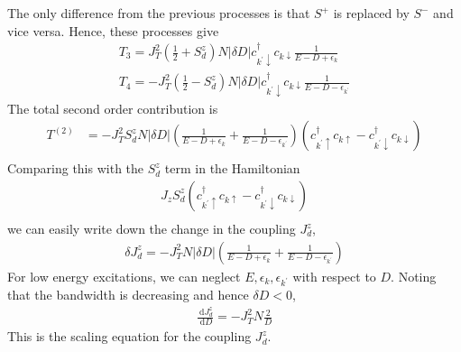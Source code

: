 \documentclass[twoside]{report}
\numberwithin{equation}{section}
\begin{document}
The only difference from the previous processes is that \(S^+\) is replaced by \(S^-\) and vice versa.
Hence, these  processes give
\begin{gather}
	T_3 = J_T^2\left(\frac{1}{2} + S_d^z\right)N|\delta D|c^\dagger_{k^\prime \downarrow}c_{k\downarrow}\frac{1}{E - D + \epsilon_k}\\
	T_4 = -J_T^2 \left(\frac{1}{2}-S_d^z\right) N |\delta D|c^\dagger_{k^\prime\downarrow} c_{k\downarrow} \frac{1}{E - D - \epsilon_{k^\prime}}
\end{gather}
The total second order contribution is
\begin{equation}\begin{aligned}
	T^{(2)} &= -J_T^2 S_d^z N|\delta D|\left(\frac{1}{E - D + \epsilon_k} + \frac{1}{E - D - \epsilon_{k^\prime}}\right)\left(c^\dagger_{k^\prime \uparrow}c_{k\uparrow} - c^\dagger_{k^\prime \downarrow}c_{k\downarrow}\right)\\
\end{aligned}\end{equation}
Comparing this with the \(S_d^z\) term in the Hamiltonian
\begin{equation}\begin{aligned}
	J_z S_d^z\left(c^\dagger_{k^\prime \uparrow}c_{k\uparrow} - c^\dagger_{k^\prime \downarrow}c_{k\downarrow}\right)\\
\end{aligned}\end{equation}
we can easily write down the change in the coupling \(J_d^z\),
\begin{equation}\begin{aligned}
	\delta J_d^z = -J_T^2 N|\delta D|\left(\frac{1}{E - D + \epsilon_k} + \frac{1}{E - D - \epsilon_{k^\prime}}\right)
\end{aligned}\end{equation}
For low energy excitations, we can neglect \(E, \epsilon_k, \epsilon_{k^\prime}\) with respect to \(D\).
Noting that the bandwidth is decreasing and hence \(\delta D < 0\),
\begin{equation}\begin{aligned}
	\frac{\:\mathrm{d}J_d^z}{\:\mathrm{d}D}=-J_T^2N \frac{2}{D}
\end{aligned}\end{equation}
This is the scaling equation for the coupling \(J_d^z\).
\end{document}

